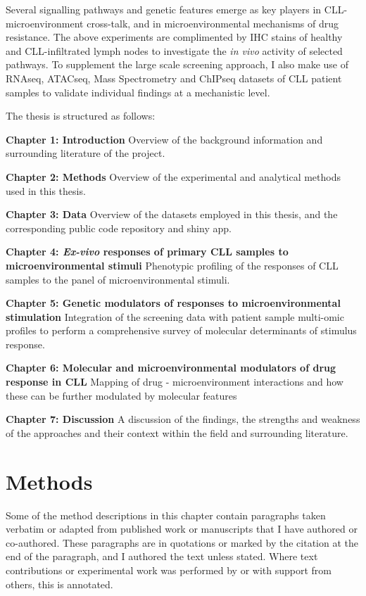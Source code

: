 \documentclass[11pt, a4paper, twosided]{book}
\begin{document}
Several signalling pathways and genetic features emerge as key players in CLL-microenvironment cross-talk, and in microenvironmental mechanisms of drug resistance. The above experiments are complimented by IHC stains of healthy and CLL-infiltrated lymph nodes to investigate the \emph{in vivo} activity of selected pathways. To supplement the large scale screening approach, I also make use of RNAseq, ATACseq, Mass Spectrometry and ChIPseq datasets of CLL patient samples to validate individual findings at a mechanistic level.

The thesis is structured as follows:

\textbf{Chapter 1: Introduction} Overview of the background information and surrounding literature of the project.

\textbf{Chapter 2: Methods} Overview of the experimental and analytical methods used in this thesis.

\textbf{Chapter 3: Data} Overview of the datasets employed in this thesis, and the corresponding public code repository and shiny app.

\textbf{Chapter 4: \emph{Ex-vivo} responses of primary CLL samples to microenvironmental stimuli }
Phenotypic profiling of the responses of CLL samples to the panel of microenvironmental stimuli.

\textbf{Chapter 5: Genetic modulators of responses to microenvironmental stimulation} Integration of the screening data with patient sample multi-omic profiles to perform a comprehensive survey of molecular determinants of stimulus response.

\textbf{Chapter 6: Molecular and microenvironmental modulators of drug response in CLL} Mapping of drug - microenvironment interactions and how these can be further modulated by molecular features

\textbf{Chapter 7: Discussion } A discussion of the findings, the strengths and weakness of the approaches and their context within the field and surrounding literature.

\hypertarget{methods}{%
\chapter{Methods}\label{methods}}

Some of the method descriptions in this chapter contain paragraphs taken verbatim or adapted from published work or manuscripts that I have authored or co-authored. These paragraphs are in quotations or marked by the citation at the end of the paragraph, and I authored the text unless stated. Where text contributions or experimental work was performed by or with support from others, this is annotated.
\end{document}

